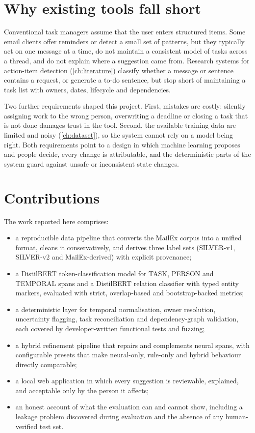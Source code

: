 \section{Why existing tools fall short}
Conventional task managers assume that the user enters structured items. Some email clients offer reminders or detect a small set of patterns, but they typically act on one message at a time, do not maintain a consistent model of tasks across a thread, and do not explain where a suggestion came from. Research systems for action-item detection (\cref{ch:literature}) classify whether a message or sentence contains a request, or generate a to-do sentence, but stop short of maintaining a task list with owners, dates, lifecycle and dependencies.

Two further requirements shaped this project. First, mistakes are costly: silently assigning work to the wrong person, overwriting a deadline or closing a task that is not done damages trust in the tool. Second, the available training data are limited and noisy (\cref{ch:dataset}), so the system cannot rely on a model being right. Both requirements point to a design in which machine learning proposes and people decide, every change is attributable, and the deterministic parts of the system guard against unsafe or inconsistent state changes.

\section{Contributions}
The work reported here comprises:
\begin{itemize}
  \item a reproducible data pipeline that converts the MailEx corpus \citep{srivastava2023mailex} into a unified format, cleans it conservatively, and derives three label sets (SILVER-v1, SILVER-v2 and MailEx-derived) with explicit provenance;
  \item a DistilBERT token-classification model for TASK, PERSON and TEMPORAL spans and a DistilBERT relation classifier with typed entity markers, evaluated with strict, overlap-based and bootstrap-backed metrics;
  \item a deterministic layer for temporal normalisation, owner resolution, uncertainty flagging, task reconciliation and dependency-graph validation, each covered by developer-written functional tests and fuzzing;
  \item a hybrid refinement pipeline that repairs and complements neural spans, with configurable presets that make neural-only, rule-only and hybrid behaviour directly comparable;
  \item a local web application in which every suggestion is reviewable, explained, and acceptable only by the person it affects;
  \item an honest account of what the evaluation can and cannot show, including a leakage problem discovered during evaluation and the absence of any human-verified test set.
\end{itemize}

